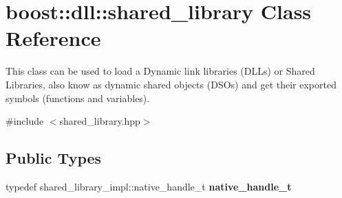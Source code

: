 \hypertarget{a01708}{}\section{boost\+:\+:dll\+:\+:shared\+\_\+library Class Reference}
\label{a01708}


This class can be used to load a Dynamic link libraries (D\+LL\textquotesingle{}s) or Shared Libraries, also know as dynamic shared objects (D\+SO\textquotesingle{}s) and get their exported symbols (functions and variables).  




{\ttfamily \#include $<$shared\+\_\+library.\+hpp$>$}

\subsection*{Public Types}
\begin{DoxyCompactItemize}
\item 
\mbox{\label{a01708_a1426dcbd29eac5cef8da0e9218c2c127}} 
typedef shared\+\_\+library\+\_\+impl\+::native\+\_\+handle\+\_\+t {\bfseries native\+\_\+handle\+\_\+t}
\end{DoxyCompactItemize}
